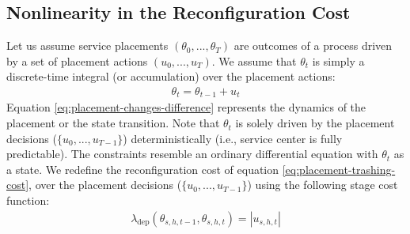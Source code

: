 \subsection{Nonlinearity in the Reconfiguration Cost} 
 Let us assume service placements $(\theta_{0},...,\theta_T)$ are outcomes of a process driven by a set of placement actions $(u_0,...,u_T)$. 	
 We assume that $\theta_t$ is simply a discrete-time integral (or accumulation) over the placement actions:
 \begin{align} \label{eq:placement-changes-difference}
  \theta_t = \theta_{t-1} +  u_t   
  \end{align}     
Equation \ref{eq:placement-changes-difference} represents the dynamics of the placement or the state transition.  
 Note that $\theta_{t}$ is solely driven by the placement decisions ($\{u_0,...,u_{T-1}\}$) deterministically (i.e., service center is fully predictable). The constraints resemble an ordinary differential equation with $\theta_{t}$ as a state. 
	We redefine the reconfiguration cost of equation \ref{eq:placement-trashing-cost}, over the placement decisions ($\{u_0,...,u_{T-1}\}$) using the following stage cost function:
	\begin{align}
	\lambda_\text{dep}(\theta_{s,h,t-1},\theta_{s,h,t}) =|u_{s,h,t} |
	\end{align}



